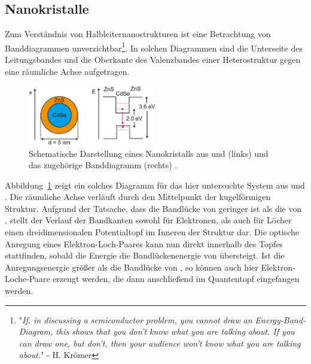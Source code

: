 \subsection{Nanokristalle}
Zum Verständnis von Halbleiternanostrukturen ist eine Betrachtung von Banddiagrammen unverzichtbar\footnote{"\textit{If,
in discussing a semiconductor problem, you cannot draw an Energy-Band-Diagram, this shows
that you don't know what you are talking about. If you can draw one, but don't, then your audience
won't know what you are talking about.}"  - H. Krömer}. In solchen Diagrammen sind
die Unterseite des Leitungsbandes und die Oberkante des Valenzbandes einer Heterostruktur gegen eine
räumliche Achse aufgetragen.
\begin{figure}
  \centering
  \includegraphics[width = 0.5\textwidth]{pics/banddiagramm.png}
  \caption{Schematische Darstellung eines Nanokristalls aus  und  (links) und
  das zugehörige Banddiagramm (rechts) \cite{anleitung_pl}.}
  \label{fig: energy_diagram}
\end{figure}
Abbildung~\ref{fig: energy_diagram} zeigt ein solches Diagramm für das hier untersuchte System aus  und
. Die räumliche Achse verläuft durch den Mittelpunkt der kugelförmigen Struktur. Aufgrund der Tatsache, dass
die Bandlücke von  geringer ist als die von , stellt der Verlauf der Bandkanten sowohl für Elektronen, als auch
für Löcher einen dreidimensionalen Potentialtopf im Inneren der Struktur dar. Die optische Anregung eines Elektron-Loch-Paares
kann nun direkt innerhalb des Topfes stattfinden, sobald die Energie die Bandlückenenergie von  übersteigt. Ist die
Anregungsenergie größer als die Bandlücke von , so können auch hier Elektron-Loche-Paare erzeugt werden, die dann
anschließend im Quantentopf eingefangen werden.

